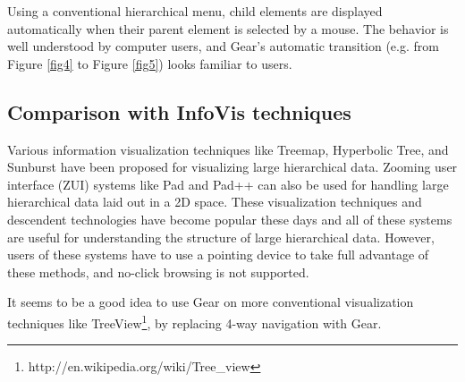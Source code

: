 \documentclass[conference]{IEEEtran}
\begin{document}
Using a conventional hierarchical menu,
child elements are displayed automatically when their parent element is selected by a mouse.
The behavior is well understood by computer users,
and Gear's automatic transition (e.g. from Figure \ref{fig4} to Figure \ref{fig5})
looks familiar to users.

\subsection{Comparison with InfoVis techniques}

Various information visualization techniques like
Treemap\cite{Johnson:1991:TSA:949607.949654},
Hyperbolic Tree\cite{Lamping:1995:FTB:223904.223956},
and Sunburst\cite{Stasko:2000:FDN:857190.857683}
have been proposed for visualizing large hierarchical data.
Zooming user interface (ZUI) systems like
Pad\cite{Perlin:1993:PAA:166117.166125} and
Pad++\cite{Bederson:1994:PZG:192426.192435}
can also be used for handling large hierarchical data laid out in a 2D space.
%
These visualization techniques and descendent technologies have become popular these days and
all of these systems are useful for understanding the structure of
large hierarchical data.
However, users of these systems have to use a pointing device
to take full advantage of these methods, and
no-click browsing is not supported.

It seems to be a good idea to use Gear on more conventional visualization techniques like
TreeView\footnote{
  \textsf{http://en.wikipedia.org/wiki/Tree\_view}
}, by replacing 4-way navigation with Gear.


\end{document}
